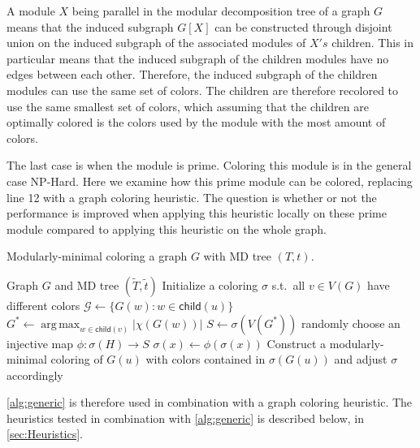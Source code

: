 \documentclass[a4paper]{article}
\newcommand{\child}{\mathsf{child}}
\DeclareMathOperator*{\argmax}{arg\,max}
\newcommand{\T}{\widetilde{T}}
\renewcommand{\t}{\widetilde{t}}
\begin{document}
A module $X$ being parallel in the modular decomposition tree of a graph $G$ means that
the induced subgraph $G[X]$ can be constructed through disjoint union on the induced
subgraph of the associated modules of $X's$ children. This in particular means that 
the induced subgraph of the children modules have no edges between each other. Therefore,
the induced subgraph of the children modules can use the same set of colors. The children
are therefore recolored to use the same smallest set of colors, 
which assuming that the children are optimally colored is the colors used by the module 
with the most amount of colors.

The last case is when the module is prime. Coloring this module is in the
general case NP-Hard. Here we examine how this prime module can be colored,
replacing line 12 with a graph coloring heuristic. The question is whether or
not the performance is improved when applying this heuristic locally on these
prime module compared to applying this heuristic on the whole graph.

\begin{algorithm}[H]
  \caption{Modularly-minimal coloring a graph $G$ with MD tree $(T,t)$.}
  \label{alg:generic}
  \begin{algorithmic}[1]
    \REQUIRE Graph $G$ and MD tree $(\T,\t)$
    \STATE Initialize a coloring $\sigma$ s.t.\ all $v \in V(G)$
           have different colors
          \STATE $\mathcal{G} \leftarrow \{G(w)\colon w\in\child(u)\}$ 
          \STATE $G^* \leftarrow \argmax_{w\in\child(v)} |\chi(G(w))|$
          \STATE $S \leftarrow \sigma(V(G^*))$ 
             \STATE randomly choose an injective map $\phi:\sigma(H)\to S$
                \STATE $\sigma(x)\leftarrow \phi(\sigma(x))$  
             \ENDFOR
          \ENDFOR
          \STATE Construct a modularly-minimal coloring of $G(u)$
              with colors contained in $\sigma(G(u))$
              and adjust $\sigma$ accordingly 
       \ENDIF
    \ENDFOR
  \end{algorithmic}
\end{algorithm}

\autoref{alg:generic} is therefore used in combination with a graph coloring
heuristic. The heuristics tested in combination with \autoref{alg:generic} is
described below, in \autoref{sec:Heuristics}.
\end{document}
